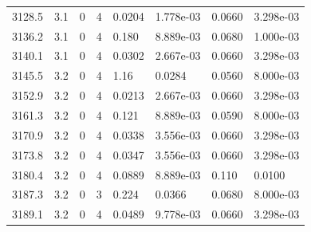 \documentclass[preview]{standalone}
\begin{document}
{{{{{{{{{{{{{{\begin{tabular}{L{1.2cm}C{1.2cm} C{0.3cm}C{0.5cm} C{1.4cm}C{1.4cm} C{1.4cm}C{1.4cm}}
  3128.5  &   3.1  & 0     &  4 &  0.0204  & 1.778e-03  & 0.0660 &  3.298e-03   \\ 
  3136.2  &   3.1  & 0     &  4 &  0.180  & 8.889e-03  & 0.0680 &  1.000e-03   \\ 
  3140.1  &   3.1  & 0     &  4 &  0.0302  & 2.667e-03  & 0.0660 &  3.298e-03   \\ 
  3145.5  &   3.2  & 0     &  4 &  1.16  & 0.0284  & 0.0560 &  8.000e-03   \\ 
  3152.9  &   3.2  & 0     &  4 &  0.0213  & 2.667e-03  & 0.0660 &  3.298e-03   \\ 
  3161.3  &   3.2  & 0     &  4 &  0.121  & 8.889e-03  & 0.0590 &  8.000e-03   \\ 
  3170.9  &   3.2  & 0     &  4 &  0.0338  & 3.556e-03  & 0.0660 &  3.298e-03   \\ 
  3173.8  &   3.2  & 0     &  4 &  0.0347  & 3.556e-03  & 0.0660 &  3.298e-03   \\ 
  3180.4  &   3.2  & 0     &  4 &  0.0889  & 8.889e-03  & 0.110 &  0.0100   \\ 
  3187.3  &   3.2  & 0     &  3 &  0.224  & 0.0366  & 0.0680 &  8.000e-03   \\ 
  3189.1  &   3.2  & 0     &  4 &  0.0489  & 9.778e-03  & 0.0660 &  3.298e-03   \\ 
\hline 
\end{tabular} 

}}}}}}}}}}}}}}
\end{document}
